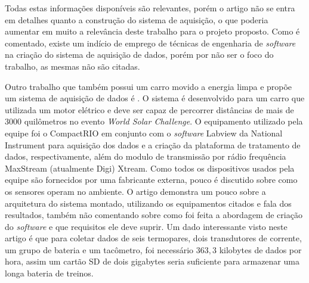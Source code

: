 Todas estas informações disponíveis são relevantes, porém o artigo não se entra em detalhes quanto a construção do sistema de aquisição, o que poderia aumentar em muito a relevância deste trabalho para o projeto proposto. Como é comentado, existe um indício de emprego de técnicas de engenharia de \textit{software} na criação do sistema de aquisição de dados, porém por não ser o foco do trabalho, as mesmas não são citadas. 

Outro trabalho que também possui um carro movido a energia limpa e propõe um sistema de aquisição de dados é . O sistema é desenvolvido para um carro que utilizada um motor elétrico e deve ser capaz de percorrer distâncias de mais de 3000 quilômetros no evento \textit{World Solar Challenge}. O equipamento utilizado pela equipe foi o CompactRIO em conjunto com o \textit{software} Labview da National Instrument para aquisição dos dados e a criação da plataforma de tratamento de dados, respectivamente, além do modulo de transmissão por rádio frequência MaxStream (atualmente Digi) Xtream. Como todos os dispositivos usados pela equipe são fornecidos por uma fabricante externa, pouco é discutido sobre como os sensores operam no ambiente. O artigo demonstra um pouco sobre a arquitetura do sistema montado, utilizando os equipamentos citados e fala dos resultados, também não comentando sobre como foi feita a abordagem de criação do \textit{software} e que requisitos ele deve suprir. Um dado interessante visto neste artigo é que para coletar dados de seis termopares, dois transdutores de corrente, um grupo de bateria e um tacômetro, foi necessário $363,3$ kilobytes de dados por hora, assim um cartão SD de dois gigabytes seria suficiente para armazenar uma longa bateria de treinos. 


